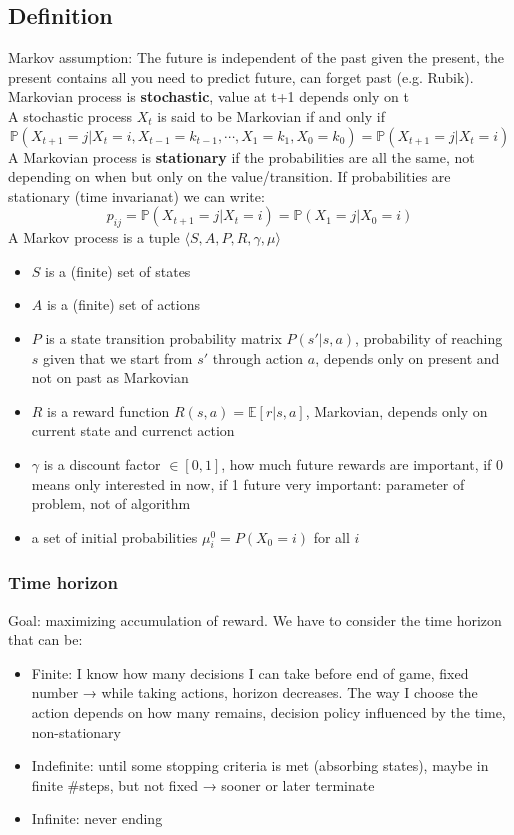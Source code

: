 \subsection{Definition}
    Markov assumption: The future is independent of the past given the present, the present contains all you need to predict future, can forget past (e.g. Rubik).\\
    Markovian process is \textbf{stochastic}, value at t+1 depends only on t\\
    A stochastic process $X_t$ is said to be Markovian if and only if
    $$\mathbb{P}(X_{t+1}=j|X_t=i,X_{t-1}=k_{t-1},\cdots,X_1=k_1,X_0=k_0)=\mathbb{P}(X_{t+1}=j|X_t=i)$$
    A Markovian process is \textbf{stationary} if the probabilities are all the same, not depending on when but only on the value/transition. If probabilities are stationary (time invarianat) we can write:
    $$p_{ij}=\mathbb{P}(X_{t+1}=j|X_t=i)=\mathbb{P}(X_1=j|X_0=i)$$
    A Markov process is a tuple $\langle S,A,P,R,\gamma,\mu\rangle$
    \begin{itemize}
        \item $S$ is a (finite) set of states
        \item $A$ is a (finite) set of actions
        \item $P$ is a state transition probability matrix $P(s'|s,a)$, probability of reaching $s$ given that we start from $s'$ through action $a$, depends only on present and not on past as Markovian
        \item $R$ is a reward function $R(s,a)=\mathbb{E}[r|s,a]$, Markovian, depends only on current state and currenct action
        \item $\gamma$ is a discount factor $\in [0,1]$, how much future rewards are important, if 0 means only interested in now, if 1 future very important: parameter of problem, not of algorithm
        \item a set of initial probabilities $\mu_i^0=P(X_0=i)$ for all $i$
    \end{itemize}


\subsubsection{Time horizon}
    Goal: maximizing accumulation of reward. We have to consider the time horizon that can be:
    \begin{itemize}
        \item Finite: I know how many decisions I can take before end of game, fixed number → while taking actions, horizon decreases. The way I choose the action depends on how many remains, decision policy influenced by the time, non-stationary
        \item Indefinite: until some stopping criteria is met (absorbing states), maybe in finite \#steps, but not fixed → sooner or later terminate
        \item Infinite: never ending
    \end{itemize}
